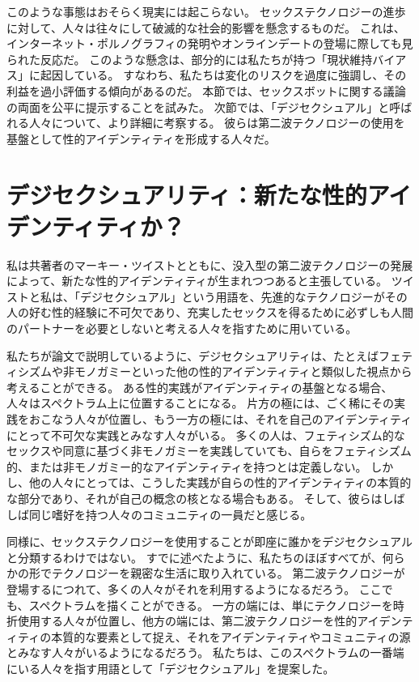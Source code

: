 \documentclass[paper=a4,book,openany]{jlreq} \usepackage{mystyle}
\begin{document}
このような事態はおそらく現実には起こらない。
セックステクノロジーの進歩に対して、人々は往々にして破滅的な社会的影響を懸念するものだ。
これは、インターネット・ポルノグラフィの発明やオンラインデートの登場に際しても見られた反応だ。
このような懸念は、部分的には私たちが持つ「現状維持バイアス」に起因している。
すなわち、私たちは変化のリスクを過度に強調し、その利益を過小評価する傾向があるのだ。
本節では、セックスボットに関する議論の両面を公平に提示することを試みた。
次節では、「デジセクシュアル」と呼ばれる人々について、より詳細に考察する。
彼らは第二波テクノロジーの使用を基盤として性的アイデンティティを形成する人々だ。

\section{デジセクシュアリティ：新たな性的アイデンティティか？}

私は共著者のマーキー・ツイストとともに、没入型の第二波テクノロジーの発展によって、新たな性的アイデンティティが生まれつつあると主張している。
ツイストと私は、「デジセクシュアル」という用語を、先進的なテクノロジーがその人の好む性的経験に不可欠であり、充実したセックスを得るために必ずしも人間のパートナーを必要としないと考える人々を指すために用いている\citep[pp.4--6]{mcarthur17:_rise_digis}。

私たちが論文で説明しているように、デジセクシュアリティは、たとえばフェティシズムや非モノガミーといった他の性的アイデンティティと類似した視点から考えることができる。
ある性的実践がアイデンティティの基盤となる場合、人々はスペクトラム上に位置することになる。
片方の極には、ごく稀にその実践をおこなう人々が位置し、もう一方の極には、それを自己のアイデンティティにとって不可欠な実践とみなす人々がいる。
多くの人は、フェティシズム的なセックスや同意に基づく非モノガミーを実践していても、自らをフェティシズム的、または非モノガミー的なアイデンティティを持つとは定義しない。
しかし、他の人々にとっては、こうした実践が自らの性的アイデンティティの本質的な部分であり、それが自己の概念の核となる場合もある。
そして、彼らはしばしば同じ嗜好を持つ人々のコミュニティの一員だと感じる。

同様に、セックステクノロジーを使用することが即座に誰かをデジセクシュアルと分類するわけではない。
すでに述べたように、私たちのほぼすべてが、何らかの形でテクノロジーを親密な生活に取り入れている。
第二波テクノロジーが登場するにつれて、多くの人々がそれを利用するようになるだろう。
ここでも、スペクトラムを描くことができる。
一方の端には、単にテクノロジーを時折使用する人々が位置し、他方の端には、第二波テクノロジーを性的アイデンティティの本質的な要素として捉え、それをアイデンティティやコミュニティの源とみなす人々がいるようになるだろう。
私たちは、このスペクトラムの一番端にいる人々を指す用語として「デジセクシュアル」を提案した。
\end{document}
